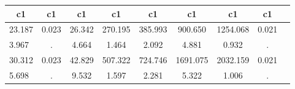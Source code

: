 \begin{table}[htbp]
\begin{tabular}{lcccccccc} \hline \hline
 \multicolumn{1}{c}{ c1 }  & c1  & c1  & c1  & c1  & c1  & c1  & c1  \\  \hline 
   23.187 &     0.023 &    26.342 &   270.195 &   385.993 &   900.650 &  1254.068 &     0.021 \\  
    3.967 &         . &     4.664 &     1.464 &     2.092 &     4.881 &     0.932 &         . \\  
   30.312 &     0.023 &    42.829 &   507.322 &   724.746 &  1691.075 &  2032.159 &     0.021 \\  
    5.698 &         . &     9.532 &     1.597 &     2.281 &     5.322 &     1.006 &         . \\  
\hline \hline \end{tabular}
\end{table}
